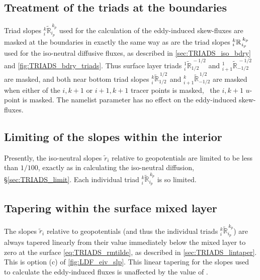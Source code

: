 \documentclass[../main/NEMO_manual]{subfiles}
\newcommand{\triadt}[5]{\ensuremath{{}_{#1}^{#2}{\tilde{\mathbb{#3}}}_{#4}^{\,#5}}}
\newcommand{\rtriad}[2][]{\ensuremath{\triad[#1]{i}{k}{#2}{i_p}{k_p}}}
\newcommand{\rtriadt}[1]{\ensuremath{\triadt{i}{k}{#1}{i_p}{k_p}}}
\begin{document}
\subsection{Treatment of the triads at the boundaries}
\label{sec:TRIADS_skew_bdry}

Triad slopes \rtriadt{R} used for the calculation of the eddy-induced skew-fluxes are masked at the boundaries
in exactly the same way as are the triad slopes \rtriad{R} used for the iso-neutral diffusive fluxes,
as described in \autoref{sec:TRIADS_iso_bdry} and \autoref{fig:TRIADS_bdry_triads}.
Thus surface layer triads $\triadt{i}{1}{R}{1/2}{-1/2}$ and $\triadt{i+1}{1}{R}{-1/2}{-1/2}$ are masked,
and both near bottom triad slopes $\triadt{i}{k}{R}{1/2}{1/2}$ and $\triadt{i+1}{k}{R}{-1/2}{1/2}$ are masked when
either of the $i,k+1$ or $i+1,k+1$ tracer points is masked, \ie\ the $i,k+1$ $u$-point is masked.
The namelist parameter  has no effect on the eddy-induced skew-fluxes.

\subsection{Limiting of the slopes within the interior}
\label{sec:TRIADS_limitskew}

Presently, the iso-neutral slopes $\tilde{r}_i$ relative to geopotentials are limited to be less than $1/100$,
exactly as in calculating the iso-neutral diffusion, \S \autoref{sec:TRIADS_limit}.
Each individual triad \rtriadt{R} is so limited.

\subsection{Tapering within the surface mixed layer}
\label{sec:TRIADS_taperskew}

The slopes $\tilde{r}_i$ relative to geopotentials (and thus the individual triads \rtriadt{R})
are always tapered linearly from their value immediately below the mixed layer to zero at the surface
\autoref{eq:TRIADS_rmtilde}, as described in \autoref{sec:TRIADS_lintaper}.
This is option (c) of \autoref{fig:LDF_eiv_slp}.
This linear tapering for the slopes used to calculate the eddy-induced fluxes is unaffected by
the value of .
\end{document}
